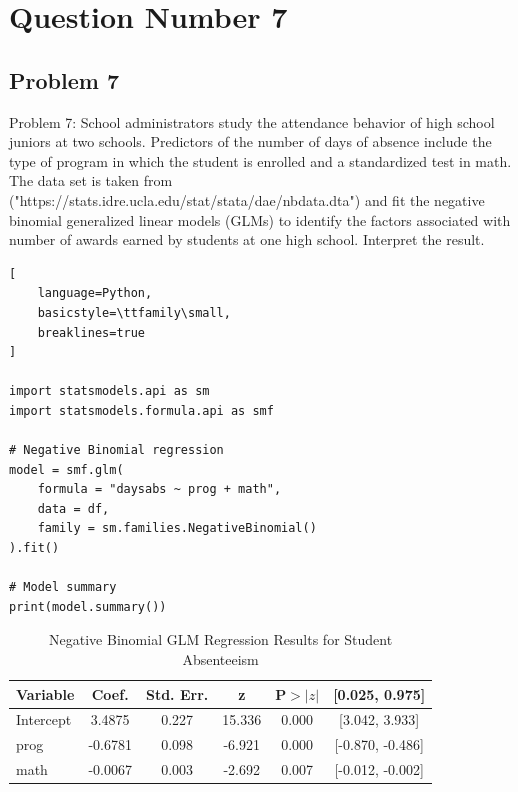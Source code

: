 \documentclass[12pt,a4paper]{report}
\begin{document}
\chapter*{Question Number 7}
\section*{Problem 7}
Problem 7:
School administrators study the attendance behavior of high school juniors at two schools. 
Predictors of the number of days of absence include the type of program in which the student is enrolled and a standardized test in math. 
The data set is taken from ("https://stats.idre.ucla.edu/stat/stata/dae/nbdata.dta") and
fit the negative binomial generalized linear models (GLMs) to identify the factors associated with number of awards earned by students at one high school.
Interpret the result.
\begin{tcolorbox}[
    enhanced,
    colback=blue!3,
    colframe=blue!70!black,
    title=Negative Binomial Regression Model,
    fonttitle=\bfseries,
    coltitle=white,
    colbacktitle=blue!70!black,
    arc=4pt,
    boxrule=1pt,
    breakable
]

\begin{lstlisting}[
    language=Python,
    basicstyle=\ttfamily\small,
    breaklines=true
]

import statsmodels.api as sm
import statsmodels.formula.api as smf

# Negative Binomial regression
model = smf.glm(
    formula = "daysabs ~ prog + math",
    data = df,
    family = sm.families.NegativeBinomial()
).fit()

# Model summary
print(model.summary())

\end{lstlisting}

\end{tcolorbox}
\begin{table}[h!]
\centering
\begin{tabular}{|l|c|c|c|c|c|}
\hline
\textbf{Variable} & \textbf{Coef.} & \textbf{Std. Err.} & \textbf{z} & \textbf{P$>|z|$} & \textbf{[0.025, 0.975]} \\ \hline
Intercept & 3.4875  & 0.227 & 15.336 & 0.000 & [3.042, 3.933] \\ \hline
prog      & -0.6781 & 0.098 & -6.921 & 0.000 & [-0.870, -0.486] \\ \hline
math      & -0.0067 & 0.003 & -2.692 & 0.007 & [-0.012, -0.002] \\ \hline
\end{tabular}
\caption{Negative Binomial GLM Regression Results for Student Absenteeism}
\label{tab:nb_glm_results}
\end{table}
\end{document}
